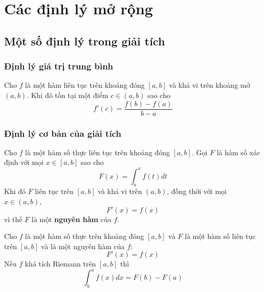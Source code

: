 \chapter{Các định lý mở rộng}

\section{Một số định lý trong giải tích}

\subsection{Định lý giá trị trung bình}

\begin{theorem}
Cho $f$ là một hàm liên tục trên khoảng đóng $[a, b]$ và khả vi trên khoảng mở $(a, b)$. Khi đó tồn tại một điểm $c \in (a, b)$ sao cho
$$
f'(c) = \frac{f(b) - f(a)}{b - a}
$$
\end{theorem}

\subsection{Định lý cơ bản của giải tích}

\begin{theorem}
Cho $f$ là một hàm số thực liên tục trên khoảng đóng $[a, b]$. Gọi $F$ là hàm số xác định với mọi $x \in [a, b]$ sao cho
$$
F(x) = \int_a^x f(t)dt
$$
Khi đó $F$ liên tục trên $[a, b]$ và khả vi trên $(a, b)$, đồng thời với mọi $x \in (a, b)$, 
$$
F'(x) = f(x)
$$
vì thế $F$ là một \textbf{nguyên hàm} của $f$.
\end{theorem}

\begin{theorem}
Cho $f$ là một hàm số thực trên khoảng đóng $[a, b]$ và $F$ là một hàm số liên tục trên $[a, b]$ và là một nguyên hàm của $f$:
$$
F'(x) = f(x)
$$
Nếu $f$ khả tích Riemann trên $[a, b]$ thì
$$
\int_b^a f(x)dx = F(b) - F(a)
$$
\end{theorem}
